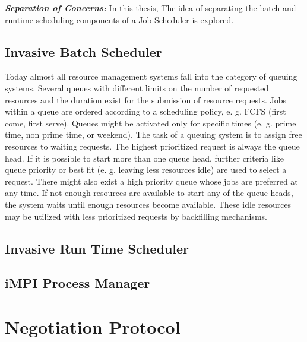 \textbf{\textit{Separation of Concerns: }}In this thesis, The idea of separating the batch and runtime scheduling components of a Job Scheduler is explored. 

\subsection{Invasive Batch Scheduler}
Today almost all resource management systems fall into the category of queuing systems. Several queues with different limits on the number of requested resources and the duration exist for the submission of resource requests. Jobs within a queue are ordered according to a scheduling policy, e. g. FCFS (first come, first serve). Queues might be activated only for specific times (e. g. prime time, non prime time, or weekend). The task of a queuing system is to assign free resources to waiting requests. The highest prioritized request is always the queue head. If it is possible to start more than one queue head, further criteria like queue priority or best fit (e. g. leaving less resources idle) are used to select a request. There might also exist a high priority queue whose jobs are preferred at any time. If not enough resources are available to start any of the queue heads, the system waits until enough resources become available. These idle resources may be utilized with less prioritized requests by backfilling mechanisms.
\subsection{Invasive Run Time Scheduler}
\subsection{iMPI Process Manager}


\section{Negotiation Protocol}
